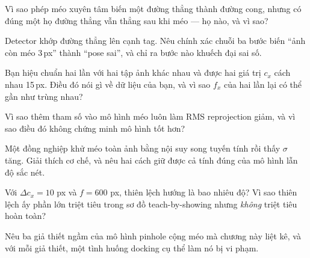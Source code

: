 \documentclass[../../marker.tex]{subfiles}
\begin{document}
\begin{tukiem}
\item Vì sao phép méo xuyên tâm biến một đường thẳng thành đường cong, nhưng có đúng một họ đường thẳng vẫn thẳng sau khi méo --- họ nào, và vì sao?
\item Detector khớp đường thẳng lên cạnh tag. Nêu chính xác chuỗi ba bước biến ``ảnh còn méo 3\,px'' thành ``pose sai'', và chỉ ra bước nào khuếch đại sai số.
\item Bạn hiệu chuẩn hai lần với hai tập ảnh khác nhau và được hai giá trị \(c_x\) cách nhau 15\,px. Điều đó nói gì về dữ liệu của bạn, và vì sao \(f_x\) của hai lần lại có thể gần như trùng nhau?
\item Vì sao thêm tham số vào mô hình méo luôn làm RMS reprojection giảm, và vì sao điều đó không chứng minh mô hình tốt hơn?
\item Một đồng nghiệp khử méo toàn ảnh bằng nội suy song tuyến tính rồi thấy \(\sigma\) tăng. Giải thích cơ chế, và nêu hai cách giữ được cả tính đúng của mô hình lẫn độ sắc nét.
\item Với \(\Delta c_x = 10\) px và \(f = 600\) px, thiên lệch hướng là bao nhiêu độ? Vì sao thiên lệch ấy phần lớn triệt tiêu trong sơ đồ teach-by-showing nhưng \emph{không} triệt tiêu hoàn toàn?
\item Nêu ba giả thiết ngầm của mô hình pinhole cộng méo mà chương này liệt kê, và với mỗi giả thiết, một tình huống docking cụ thể làm nó bị vi phạm.
\end{tukiem}
\ifSubfilesClassLoaded{\printbibliography[title={Nguồn}]}{}
\end{document}
